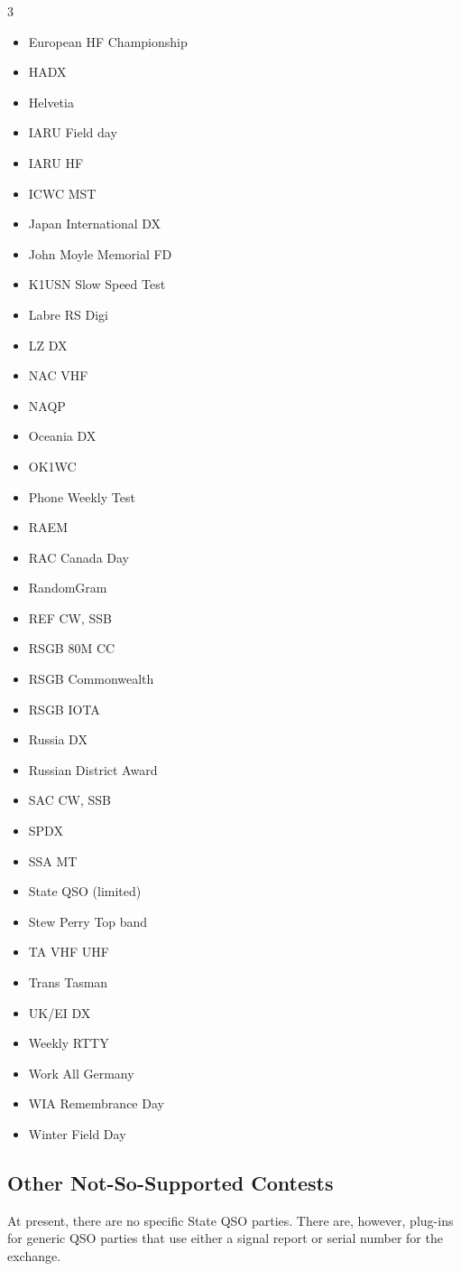 \documentclass{article}
\begin{document}
\begin{multicols}{3}
\begin{itemize}
    \item European HF Championship
    \item HADX
    \item Helvetia
    \item IARU Field day
    \item IARU HF
    \item ICWC MST
    \item Japan International DX
    \item John Moyle Memorial FD
    \item K1USN Slow Speed Test
    \item Labre RS Digi
    \item LZ DX
    \item NAC VHF
    \item NAQP
    \item Oceania DX
    \item OK1WC
    \item Phone Weekly Test
    \item RAEM
    \item RAC Canada Day
    \item RandomGram
    \item REF CW, SSB
    \item RSGB 80M CC
    \item RSGB Commonwealth
    \item RSGB IOTA
    \item Russia DX
    \item Russian District Award
    \item SAC CW, SSB
    \item SPDX
    \item SSA MT
    \item State QSO (limited)
    \item Stew Perry Top band
    \item TA VHF UHF
    \item Trans Tasman
    \item UK/EI DX
    \item Weekly RTTY
    \item Work All Germany
    \item WIA Remembrance Day
    \item Winter Field Day
\end{itemize}
\end{multicols}
\subsection{Other Not-So-Supported Contests}
At present, there are no specific State QSO parties. There are, however, plug-ins for generic QSO parties that use either a signal report or serial number for the exchange.
\newpage
\end{document}
